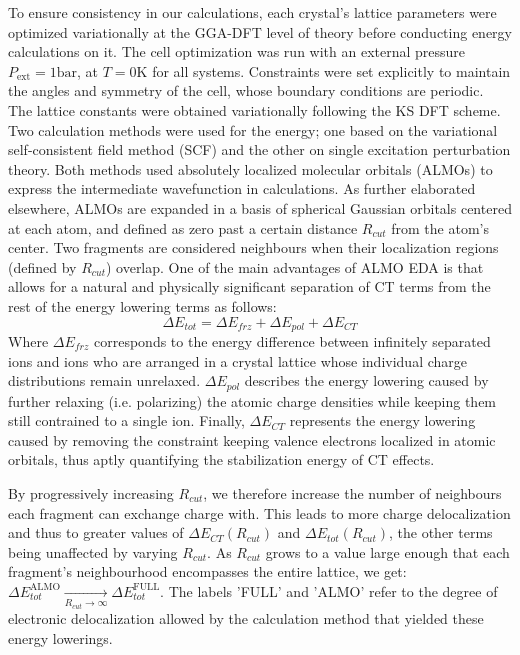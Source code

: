 \documentclass[aps,prb,twocolumn,amsmath,amssymb,superscriptaddress,longbibliography]{revtex4-1}
\begin{document}
To ensure consistency in our calculations, each crystal's lattice parameters were optimized variationally at the GGA-DFT level of theory before conducting energy calculations on it. 
The cell optimization was run with an external pressure $P_{\text{ext}} = 1 \text{bar}$, at $T = 0 \text{K}$ for all systems. 
Constraints were set explicitly to maintain the angles and symmetry of the cell, whose boundary conditions are periodic. 
The lattice constants were obtained variationally following the KS DFT scheme.\\ 

Two calculation methods were used for the energy; one based on the variational self-consistent field method (SCF) and the other on single excitation perturbation theory\cite{xpt}. 
Both methods used absolutely localized molecular orbitals (ALMOs) to express the intermediate wavefunction in calculations. 
As further elaborated elsewhere, ALMOs are expanded in a basis of spherical Gaussian orbitals centered at each atom, and defined as zero past a certain distance $R_{cut}$ from the atom's center. 
Two fragments are considered neighbours when their localization regions (defined by $R_{cut}$) overlap.
One of the main advantages of ALMO EDA is that allows for a natural and physically significant separation of CT terms from the rest of the energy lowering terms as follows:
\begin{equation}
\Delta E_{tot} = \Delta E_{frz} + \Delta E_{pol} + \Delta E_{CT}
\end{equation}
Where $\Delta E_{frz}$ corresponds to the energy difference between infinitely separated ions and ions who are arranged in a crystal lattice whose individual charge distributions remain unrelaxed. 
$\Delta E_{pol}$ describes the energy lowering caused by further relaxing (i.e. polarizing) the atomic charge densities  while keeping them still contrained to a single ion.
Finally, $\Delta E_{CT}$ represents the energy lowering caused by removing the constraint keeping valence electrons localized in atomic orbitals, thus aptly quantifying the stabilization energy of CT effects.


By progressively increasing $R_{cut}$, we therefore increase the number of neighbours each fragment can exchange charge with. 
This leads to more charge delocalization and thus to greater values of $\Delta E_{CT}\left(R_{cut}\right)$ and $\Delta E_{tot}\left(R_{cut}\right)$, the other terms being unaffected by varying $R_{cut}$. 
As $R_{cut}$ grows to a value large enough that each fragment's neighbourhood encompasses the entire lattice, we get: ${\Delta E_{tot}^{\text{ALMO}} \xrightarrow[R_{cut}\to\infty] \, \Delta E_{tot}^{\text{FULL}}}$. 
The labels 'FULL' and 'ALMO' refer to the degree of electronic delocalization allowed by the calculation method that yielded these energy lowerings.
\end{document}
